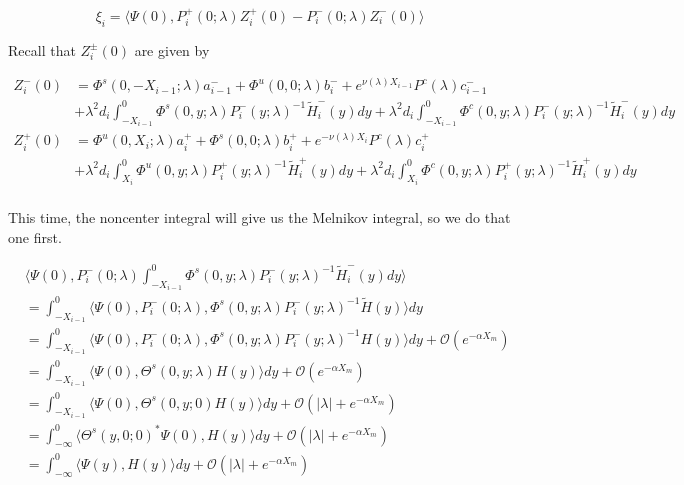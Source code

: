 \documentclass[12pt]{article}
\begin{document}
\[
\xi_i = \langle \Psi(0), P_i^+(0; \lambda) Z_i^+(0) - P_i^-(0; \lambda) Z_i^-(0) \rangle
\]

Recall that $Z_i^\pm(0)$ are given by

\begin{align*}
Z_i^-(0) &= \Phi^s(0, -X_{i-1}; \lambda) a_{i-1}^- + \Phi^u(0, 0; \lambda) b_i^- 
+ e^{\nu(\lambda) X_{i-1}} P^c(\lambda) c_{i-1}^- \\
&+ \lambda^2 d_i \int_{-X_{i-1}}^0 \Phi^s(0, y; \lambda) P_i^-(y; \lambda)^{-1} \tilde{H}_i^-(y) dy 
+ \lambda^2 d_i \int_{-X_{i-1}}^0 \Phi^c(0, y; \lambda) P_i^-(y; \lambda)^{-1} \tilde{H}_i^-(y) dy  \\ 
Z_i^+(0) &= \Phi^u(0, X_i; \lambda) a_i^+ + \Phi^s(0, 0; \lambda) b_i^+ + e^{-\nu(\lambda)X_i} P^c(\lambda) c_i^+ \\
&+ \lambda^2 d_i \int_{X_i}^0 \Phi^u(0, y; \lambda) P_i^+(y; \lambda)^{-1} \tilde{H}_i^+(y) dy 
+ \lambda^2 d_i \int_{X_i}^0 \Phi^c(0, y; \lambda) P_i^+(y; \lambda)^{-1} \tilde{H}_i^+(y) dy \\
\end{align*}

This time, the noncenter integral will give us the Melnikov integral, so we do that one first.

\begin{align*}
&\langle \Psi(0), P_i^-(0; \lambda) \int_{-X_{i-1}}^0 \Phi^s(0, y; \lambda) P_i^-(y; \lambda)^{-1} \tilde{H}_i^-(y) dy \rangle \\
&= \int_{-X_{i-1}}^0 \langle \Psi(0), P_i^-(0; \lambda), \Phi^s(0, y; \lambda) P_i^-(y; \lambda)^{-1} \tilde{H}(y) \rangle dy \\
&= \int_{-X_{i-1}}^0 \langle \Psi(0), P_i^-(0; \lambda), \Phi^s(0, y; \lambda) P_i^-(y; \lambda)^{-1} H(y) \rangle dy + \mathcal{O}({e^{-\alpha X_m}})\\
&= \int_{-X_{i-1}}^0 \langle \Psi(0), \Theta^s(0, y; \lambda) H(y) \rangle dy + \mathcal{O}({e^{-\alpha X_m}})\\
&= \int_{-X_{i-1}}^0 \langle \Psi(0), \Theta^s(0, y; 0) H(y) \rangle dy + \mathcal{O}(|\lambda| + {e^{-\alpha X_m}})\\
&= \int_{-\infty}^0 \langle \Theta^s(y, 0; 0)^* \Psi(0), H(y) \rangle dy + \mathcal{O}(|\lambda| + {e^{-\alpha X_m}})\\
&= \int_{-\infty}^0 \langle \Psi(y), H(y) \rangle dy + \mathcal{O}(|\lambda| + {e^{-\alpha X_m}})\\
\end{align*}
\end{document}
